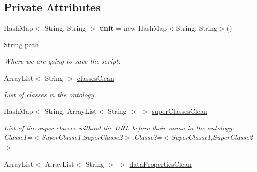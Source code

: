 \subsection*{Private Attributes}
\begin{DoxyCompactItemize}
\item 
\hypertarget{class_data_base_1_1_tables_a5f222e493ed4508b40f5fd8e50becaae}{
HashMap$<$ String, String $>$ {\bfseries unit} = new HashMap$<$String, String$>$()}
\label{class_data_base_1_1_tables_a5f222e493ed4508b40f5fd8e50becaae}

\item 
\hypertarget{class_data_base_1_1_tables_ae80958e71da9b7fc4bf4e138f377b59f}{
String \hyperlink{class_data_base_1_1_tables_ae80958e71da9b7fc4bf4e138f377b59f}{path}}
\label{class_data_base_1_1_tables_ae80958e71da9b7fc4bf4e138f377b59f}

\begin{DoxyCompactList}\small\item\em Where we are going to save the script. \end{DoxyCompactList}\item 
\hypertarget{class_data_base_1_1_tables_a780c97151dcb24984456109f95ebc22d}{
ArrayList$<$ String $>$ \hyperlink{class_data_base_1_1_tables_a780c97151dcb24984456109f95ebc22d}{classesClean}}
\label{class_data_base_1_1_tables_a780c97151dcb24984456109f95ebc22d}

\begin{DoxyCompactList}\small\item\em List of classes in the ontology. \end{DoxyCompactList}\item 
\hypertarget{class_data_base_1_1_tables_a5ec0af78ac892df612bf3ea7a91e37c5}{
HashMap$<$ String, ArrayList$<$ String $>$ $>$ \hyperlink{class_data_base_1_1_tables_a5ec0af78ac892df612bf3ea7a91e37c5}{superClassesClean}}
\label{class_data_base_1_1_tables_a5ec0af78ac892df612bf3ea7a91e37c5}

\begin{DoxyCompactList}\small\item\em List of the super classes without the URL before their name in the ontology.  Classe1=$<$SuperClasse1,SuperClasse2$>$,Classe2=$<$SuperClasse1,SuperClasse2$>$ \end{DoxyCompactList}\item 
\hypertarget{class_data_base_1_1_tables_af9e966f29b9024df669c77cc0d767c78}{
ArrayList$<$ ArrayList$<$ String $>$ $>$ \hyperlink{class_data_base_1_1_tables_af9e966f29b9024df669c77cc0d767c78}{dataPropertiesClean}}
\label{class_data_base_1_1_tables_af9e966f29b9024df669c77cc0d767c78}


\end{DoxyCompactItemize}
